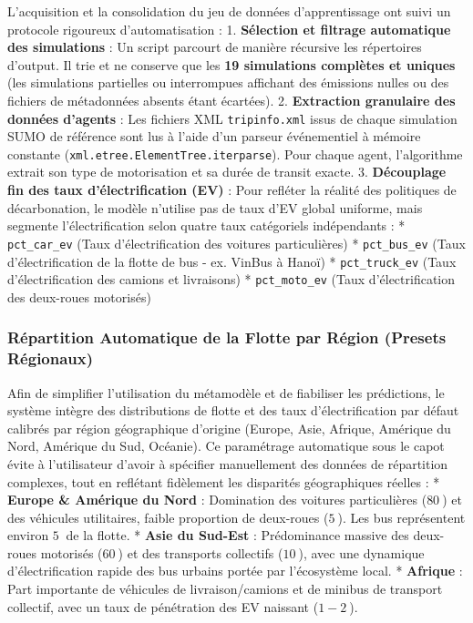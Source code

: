 \documentclass[11pt, a4paper]{article}
\begin{document}
L'acquisition et la consolidation du jeu de données d'apprentissage ont
suivi un protocole rigoureux d'automatisation : 1. \textbf{Sélection et
filtrage automatique des simulations} : Un script parcourt de manière
récursive les répertoires d'output. Il trie et ne conserve que les
\textbf{19 simulations complètes et uniques} (les simulations partielles
ou interrompues affichant des émissions nulles ou des fichiers de
métadonnées absents étant écartées). 2. \textbf{Extraction granulaire
des données d'agents} : Les fichiers XML \texttt{tripinfo.xml} issus de
chaque simulation SUMO de référence sont lus à l'aide d'un parseur
événementiel à mémoire constante
(\texttt{xml.etree.ElementTree.iterparse}). Pour chaque agent,
l'algorithme extrait son type de motorisation et sa durée de transit
exacte. 3. \textbf{Découplage fin des taux d'électrification (EV)} :
Pour refléter la réalité des politiques de décarbonation, le modèle
n'utilise pas de taux d'EV global uniforme, mais segmente
l'électrification selon quatre taux catégoriels indépendants : *
\texttt{pct\_car\_ev} (Taux d'électrification des voitures
particulières) * \texttt{pct\_bus\_ev} (Taux d'électrification de la
flotte de bus - ex. VinBus à Hanoï) * \texttt{pct\_truck\_ev} (Taux
d'électrification des camions et livraisons) * \texttt{pct\_moto\_ev}
(Taux d'électrification des deux-roues motorisés)

\subsubsection{Répartition Automatique de la Flotte par Région (Presets
Régionaux)}\label{ruxe9partition-automatique-de-la-flotte-par-ruxe9gion-presets-ruxe9gionaux}

Afin de simplifier l'utilisation du métamodèle et de fiabiliser les
prédictions, le système intègre des distributions de flotte et des taux
d'électrification par défaut calibrés par région géographique d'origine
(Europe, Asie, Afrique, Amérique du Nord, Amérique du Sud, Océanie). Ce
paramétrage automatique sous le capot évite à l'utilisateur d'avoir à
spécifier manuellement des données de répartition complexes, tout en
reflétant fidèlement les disparités géographiques réelles : *
\textbf{Europe \& Amérique du Nord} : Domination des voitures
particulières (\(80\ %
\)) et des véhicules utilitaires, faible proportion de deux-roues
(\(5\ %
\)). Les bus représentent environ \(5\ %
\) de la flotte. * \textbf{Asie du Sud-Est} : Prédominance massive des
deux-roues motorisés (\(60\ %
\)) et des transports collectifs (\(10\ %
\)), avec une dynamique d'électrification rapide des bus urbains portée
par l'écosystème local. * \textbf{Afrique} : Part importante de
véhicules de livraison/camions et de minibus de transport collectif,
avec un taux de pénétration des EV naissant (\(1-2\ %
\)).
\end{document}
